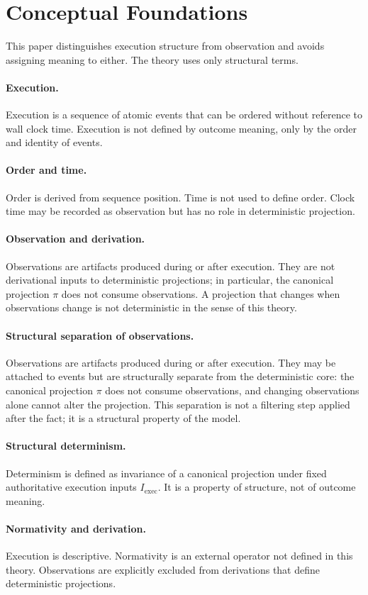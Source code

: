 \section{Conceptual Foundations}

This paper distinguishes execution structure from observation and avoids assigning meaning to either. The theory uses only structural terms.

\paragraph{Execution.}
Execution is a sequence of atomic events that can be ordered without reference to wall clock time. Execution is not defined by outcome meaning, only by the order and identity of events.

\paragraph{Order and time.}
Order is derived from sequence position. Time is not used to define order. Clock time may be recorded as observation but has no role in deterministic projection.

\paragraph{Observation and derivation.}
Observations are artifacts produced during or after execution. They are not derivational inputs to deterministic projections; in particular, the canonical projection $\pi$ does not consume observations. A projection that changes when observations change is not deterministic in the sense of this theory.

\paragraph{Structural separation of observations.}
Observations are artifacts produced during or after execution. They may be attached to events but are structurally separate from the deterministic core: the canonical projection $\pi$ does not consume observations, and changing observations alone cannot alter the projection. This separation is not a filtering step applied after the fact; it is a structural property of the model.

\paragraph{Structural determinism.}
Determinism is defined as invariance of a canonical projection under fixed authoritative execution inputs $I_{\text{exec}}$. It is a property of structure, not of outcome meaning.

\paragraph{Normativity and derivation.}
Execution is descriptive. Normativity is an external operator not defined in this theory. Observations are explicitly excluded from derivations that define deterministic projections.
